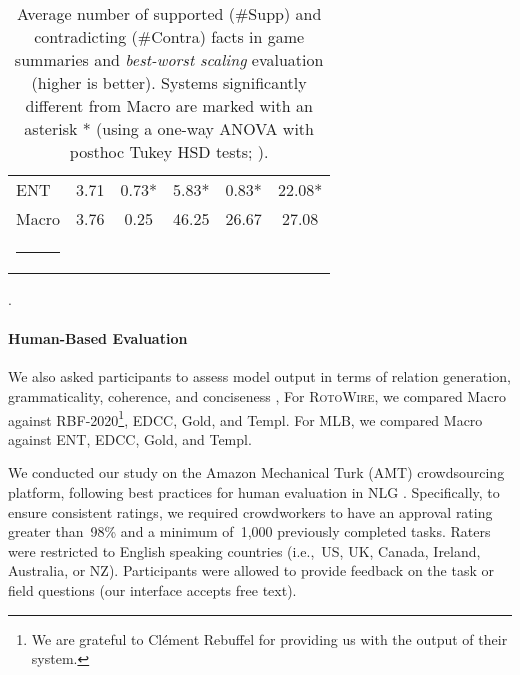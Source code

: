 \documentclass[11pt,a4paper]{article}
\makeatletter
\newcommand{\thickhline}{\noalign {\ifnum 0=`}\fi \hrule height 1pt
    \futurelet \reserved@a \@xhline
}
\makeatother
\begin{document}
\begin{table}[t]
\begin{tabular}{@{}l@{~~}l@{~~}c@{~~}c@{~~}c@{~~}c@{}}
ENT  & 3.71 & \hspace*{0.05cm}0.73* & \hspace*{0.2cm}5.83* & \hspace*{-.2cm}0.83*& \hspace*{-.05cm}22.08* \\
Macro  & 3.76 & \hspace*{-.1cm}0.25 &  \hspace*{.1cm}46.25 & \hspace*{-.3cm}26.67 &27.08\\
\thickhline
\end{tabular}
\caption{Average number of supported (\#Supp) and contradicting
  (\#Contra) facts in game summaries and \textit{best-worst scaling}
  evaluation (higher is better).  Systems significantly different from
  Macro are marked with an asterisk * (using a one-way ANOVA with
  posthoc Tukey HSD tests; \mbox{}).  }.
  \label{tbl:mlb-human-eval}
\end{table}





\paragraph{Human-Based Evaluation}
We also asked participants to assess model output in terms of relation
generation, grammaticality, coherence, and conciseness
\cite{wiseman-etal-2017-challenges,
  DBLP:journals/corr/abs-1809-00582,puduppully-etal-2019-data}, For
\textsc{RotoWire}, we compared Macro against RBF-2020\footnote{We are
  grateful to Cl\'{e}ment Rebuffel for providing us with the output of
  their system.}, EDCC, Gold, and Templ. For MLB, we compared Macro
against ENT, EDCC, Gold, and Templ. 



We conducted our study on the Amazon Mechanical Turk (AMT)
crowdsourcing platform,  following best practices for human evaluation in NLG
\cite{van-der-lee-etal-2019-best}. Specifically,
to ensure consistent ratings, we required crowdworkers to have an
approval rating greater than~98\% and a minimum of~1,000 previously
completed tasks.  Raters were restricted to English speaking countries
(i.e.,~US, UK, Canada, Ireland, Australia, or NZ). Participants were allowed to provide feedback on the task or field
questions (our interface accepts free text).
\end{document}
